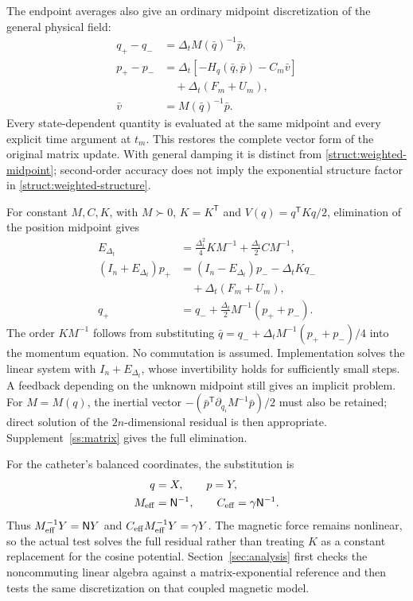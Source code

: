 The endpoint averages also give an ordinary midpoint discretization of the general physical field:
\begin{equation}\label{struct:mechanical-midpoint}
\begin{aligned}
 q_+-q_-&=\Delta_t M(\bar q)^{-1}\bar p,\\
 p_+-p_-&=\Delta_t[-H_q(\bar q,\bar p)-C_m\bar v]\\
           &\quad+\Delta_t(F_m+U_m),\\
 \bar v&=M(\bar q)^{-1}\bar p.
\end{aligned}
\end{equation}
Every state-dependent quantity is evaluated at the same midpoint and every explicit time argument at $t_m$. This restores the complete vector form of the original matrix update. With general damping it is distinct from \eqref{struct:weighted-midpoint}; second-order accuracy does not imply the exponential structure factor in \eqref{struct:weighted-structure}.

For constant $M,C,K$, with $M\succ0$, $K=K^{\mathsf T}$ and $V(q)=q^{\mathsf T}Kq/2$, elimination of the position midpoint gives
\begin{equation}\label{struct:matrix-elimination}
\begin{aligned}
 E_{\Delta_t}&=\tfrac{\Delta_t^2}{4}KM^{-1}
                         +\tfrac{\Delta_t}{2}CM^{-1},\\
 (I_n+E_{\Delta_t})p_+
    &=(I_n-E_{\Delta_t})p_--\Delta_tKq_-\\
    &\quad+\Delta_t(F_m+U_m),\\
 q_+&=q_-+\tfrac{\Delta_t}{2}M^{-1}(p_++p_-).
\end{aligned}
\end{equation}
The order $KM^{-1}$ follows from substituting $\bar q=q_-+\Delta_tM^{-1}(p_++p_-)/4$ into the momentum equation. No commutation is assumed. Implementation solves the linear system with $I_n+E_{\Delta_t}$, whose invertibility holds for sufficiently small steps. A feedback depending on the unknown midpoint still gives an implicit problem. For $M=M(q)$, the inertial vector $-(\bar p^{\mathsf T}\partial_{q_i}M^{-1}\bar p)/2$ must also be retained; direct solution of the $2n$-dimensional residual is then appropriate. Supplement~\ref{ss:matrix} gives the full elimination.

For the catheter's balanced coordinates, the substitution is
\begin{equation}\label{struct:effective-matrices}
\begin{aligned}
 q&=X,\qquad p=Y,\\
 M_{\rm eff}&=\mathsf N^{-1},\qquad
 C_{\rm eff}=\gamma\mathsf N^{-1}.
\end{aligned}
\end{equation}
Thus $M_{\rm eff}^{-1}Y=\mathsf N Y$ and $C_{\rm eff}M_{\rm eff}^{-1}Y=\gamma Y$. The magnetic force remains nonlinear, so the actual test solves the full residual rather than treating $K$ as a constant replacement for the cosine potential. Section~\ref{sec:analysis} first checks the noncommuting linear algebra against a matrix-exponential reference and then tests the same discretization on that coupled magnetic model.

